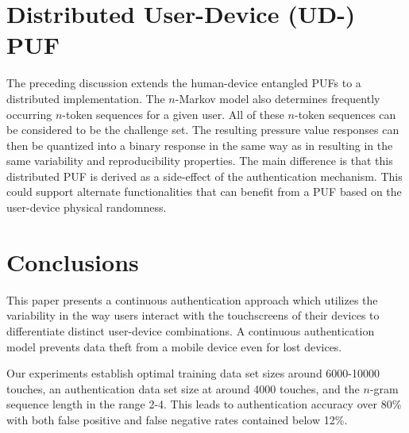 \documentclass{acm_proc_article-sp}
\begin{document}
\section{Distributed User-Device (UD-) PUF}
\label{sec:PUF}
The preceding discussion extends the human-device entangled PUFs \cite{ScheelTyagi15} to a distributed
implementation. The $n$-Markov model also determines frequently occurring $n$-token sequences for a
given user. All of these $n$-token sequences can be considered to be the challenge set. The resulting
pressure value responses can then be quantized into a binary response in the same way as in 
\cite{ScheelTyagi15} resulting in the same variability and reproducibility properties. The main 
difference is that this distributed PUF is derived as a side-effect of the authentication mechanism.
This could support alternate functionalities that can benefit from a PUF based on the user-device 
physical randomness.

\section{Conclusions}
\label{sec:conclusions}
This paper presents a continuous authentication approach which utilizes the variability in the way users interact with the touchscreens of their devices to differentiate distinct user-device combinations. 
A continuous authentication model prevents data theft from a mobile device even for lost devices.

Our experiments establish optimal training data set sizes around 6000-10000 touches, an authentication
data set size at around 4000 touches, and the $n$-gram sequence length in the range 2-4. This leads to
authentication accuracy over 80\% with both false positive and false negative rates contained
below 12\%.



%



%
\end{document}

